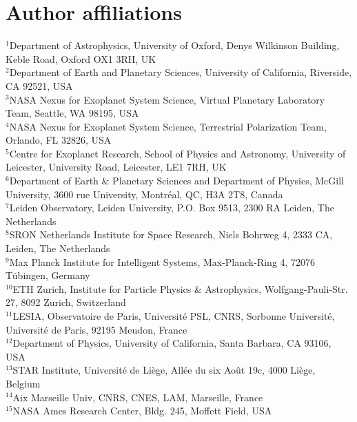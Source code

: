 \documentclass[
    usenatbib,
]{mnras}
\makeatletter
\newcommand{\affdest}[1]{\Hy@raisedlink{\hypertarget{#1}{}}$^\mathrm{#1}$}
\makeatother
\begin{document}
\section*{Author affiliations}
\begingroup
    \itshape
    \raggedright
    \affdest{1}Department of Astrophysics, University of Oxford, Denys Wilkinson Building, Keble Road, Oxford OX1 3RH, UK \\[0.5mm]
    \affdest{2}Department of Earth and Planetary Sciences, University of California, Riverside, CA 92521, USA \\[0.5mm]
    \affdest{3}NASA Nexus for Exoplanet System Science, Virtual Planetary Laboratory Team, Seattle, WA 98195, USA \\[0.5mm]
    \affdest{4}NASA Nexus for Exoplanet System Science, Terrestrial Polarization Team, Orlando, FL 32826, USA \\[0.5mm]
    \affdest{5}Centre for Exoplanet Research, School of Physics and Astronomy, University of Leicester, University Road, Leicester, LE1 7RH, UK \\[0.5mm]
    \affdest{6}Department of Earth \& Planetary Sciences and Department of Physics, McGill University, 3600 rue University, Montréal, QC, H3A 2T8, Canada \\[0.5mm]
    \affdest{7}Leiden Observatory, Leiden University, P.O. Box 9513, 2300 RA Leiden, The Netherlands \\[0.5mm]
    \affdest{8}SRON Netherlands Institute for Space Research, Niels Bohrweg 4, 2333 CA, Leiden, The Netherlands \\[0.5mm]
    \affdest{9}Max Planck Institute for Intelligent Systems, Max-Planck-Ring 4, 72076 Tübingen, Germany \\[0.5mm]
    \affdest{10}ETH Zurich, Institute for Particle Physics \& Astrophysics, Wolfgang-Pauli-Str. 27, 8092 Zurich, Switzerland \\[0.5mm]
    \affdest{11}LESIA, Observatoire de Paris, Université PSL, CNRS, Sorbonne Université, Université de Paris, 92195 Meudon, France \\[0.5mm]
    \affdest{12}Department of Physics, University of California, Santa Barbara, CA 93106, USA \\[0.5mm]
    \affdest{13}STAR Institute, Université de Liège, Allée du six Août 19c, 4000 Liège, Belgium \\[0.5mm]
    \affdest{14}Aix Marseille Univ, CNRS, CNES, LAM, Marseille, France \\[0.5mm]
    \affdest{15}NASA Ames Research Center, Bldg. 245, Moffett Field, USA \\[0.5mm]
\end{document}

